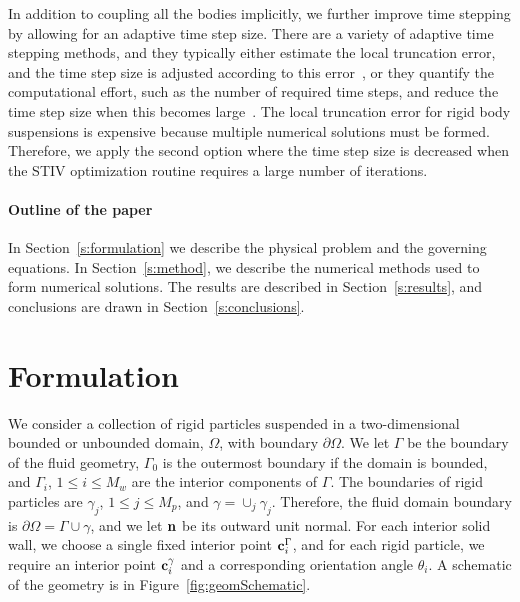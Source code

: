 \documentclass[preprint, 10pt]{elsarticle}
\begin{document}
In addition to coupling all the bodies implicitly, we further improve
time stepping by allowing for an adaptive time step size.  There are a
variety of adaptive time stepping methods, and they typically either
estimate the local truncation error, and the time step size is adjusted
according to this error~\cite{Quaife2015, Quaife2015a, Sorgentone2018},
or they quantify the computational effort, such as the number of
required time steps, and reduce the time step size when this becomes
large~\cite{Kropinski1999}.  The local truncation error for rigid body
suspensions is expensive because multiple numerical solutions must be
formed.  Therefore, we apply the second option where the time step size
is decreased when the STIV optimization routine requires a large number
of iterations.

\paragraph{Outline of the paper}
In Section~\ref{s:formulation} we describe the physical problem and the
governing equations.  In Section~\ref{s:method}, we describe the
numerical methods used to form numerical solutions.
The results are described in Section~\ref{s:results}, and conclusions
are drawn in Section~\ref{s:conclusions}.


\section{Formulation\label{s:formulation}} 
We consider a collection of rigid particles suspended in a
two-dimensional bounded or unbounded domain, $\Omega$, with boundary
$\partial\Omega$. We let $\Gamma$ be the boundary of the fluid geometry,
$\Gamma_0$ is the outermost boundary if the domain is bounded, and
$\Gamma_i$, $1\leq i \leq M_w$ are the interior components of $\Gamma$.
The boundaries of rigid particles are $\gamma_j$, $1\leq j\leq M_p$, and
$\gamma = \cup_{j} \gamma_j$. Therefore, the fluid domain boundary is
$\partial\Omega =\Gamma \cup \gamma$, and we let ${\mathbf{n}}$ be its outward
unit normal.  For each interior solid wall, we choose a single fixed
interior point ${\mathbf{c}}^\Gamma_i$, and for each rigid particle, we require
an interior point ${\mathbf{c}}^\gamma_i$ and a corresponding orientation angle
$\theta_i$.  A schematic of the geometry is in
Figure~\ref{fig:geomSchematic}.
\end{document}
